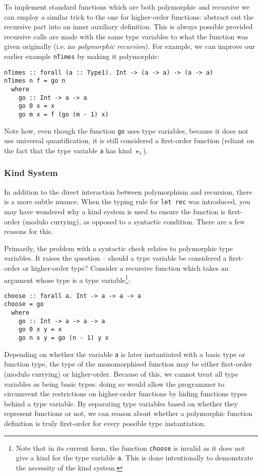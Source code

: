 \documentclass[runningheads]{llncs}
\begin{document}
To implement standard functions which are both polymorphic and recursive we can employ a similar trick to the one for higher-order functions: abstract out the recursive part into an inner auxiliary definition. This is always possible provided recursive calls are made with the same type variables to what the function was given originally (i.e. no \textit{polymorphic recursion}). For example, we can improve our earlier example \texttt{nTimes} by making it polymorphic:

\begin{verbatim}
nTimes :: forall (a :: Type1). Int -> (a -> a) -> (a -> a)
nTimes n f = go n
  where
    go :: Int -> a -> a
    go 0 x = x
    go m x = f (go (m - 1) x)
\end{verbatim}

Note how, even though the function \texttt{go} uses type variables, because it does not use universal quantification, it is still considered a first-order function (reliant on the fact that the type variable \texttt{a} has kind $\star_1$).

\subsubsection{Kind System} \label{sec:kind-system}

In addition to the direct interaction between polymorphism and recursion, there is a more subtle nuance. When the typing rule for \texttt{let rec} was introduced, you may have wondered why a kind system is used to ensure the function is first-order (modulo currying), as opposed to a syntactic condition. There are a few reasons for this.

Primarily, the problem with a syntactic check relates to polymorphic type variables. It raises the question -- should a type variable be considered a first-order or higher-order type? Consider a recursive function which takes an argument whose type is a type variable\footnote{Note that in its current form, the function \texttt{choose} is invalid as it does not give a kind for the type variable \texttt{a}. This is done intentionally to demonstrate the necessity of the kind system.}:

\begin{verbatim}
choose :: forall a. Int -> a -> a -> a
choose = go
  where
    go :: Int -> a -> a -> a
    go 0 x y = x
    go n x y = go (n - 1) y x
\end{verbatim}

Depending on whether the variable \texttt{a} is later instantiated with a basic type or function type, the type of the monomorphised function may be either first-order (modulo currying) or higher-order. Because of this, we cannot treat all type variables as being basic types: doing so would allow the programmer to circumvent the restrictions on higher-order functions by hiding functions types behind a type variable. By separating type variables based on whether they represent functions or not, we can reason about whether a polymorphic function definition is truly first-order for every possible type instantiation. 
\end{document}
